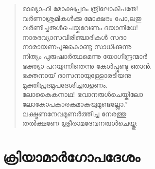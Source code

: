 \begin{verse}
മാഖ്യാഹി മോക്ഷപ്രദം ത്രിലോകീപതേ!\\
വര്‍ണാശ്രമികള്‍ക്കു മോക്ഷദം പോ,ലതു\\
വര്‍ണിച്ചരുള്‍ചെയ്കവേണം ദയാനിധേ!\\
നാരദവ്യാസവിരിഞ്ചാദികള്‍ സദാ\\
നാരായണപൂജകൊണ്ടു സാധിക്കുന്നു\\
നിത്യം പുരുഷാര്‍ത്ഥമെന്നു യോഗീന്ദ്രന്മാര്‍\\
ഭക്ത്യാ പറയുന്നിതെന്നു കേള്‍പ്പുണ്ടു ഞാന്‍.\\
ഭക്തനായ് ദാസനായുള്ളോരടിയനു\\
മുക്തിപ്രദമുപദേശിച്ചരുളണം.\\
ലോകൈകനാഥ! ഭവാനരുള്‍ചെയ്കിലോ\\
ലോകോപകാരകമാകയുമുണ്ടല്ലോ.”\\
ലക്ഷ്മണനേവമുണര്‍ത്തിച്ച നേരത്തു\\
തല്‍ക്ഷണേ ശ്രീരാമദേവനരുള്‍ചെയ്തു:
\end{verse}


\section{ക്രിയാമാര്‍ഗോപദേശം}

